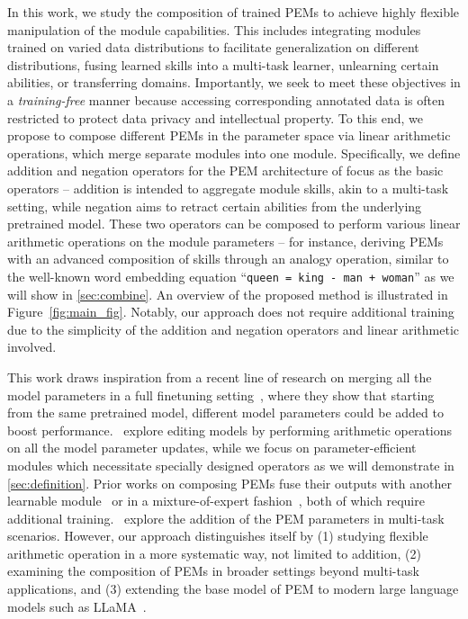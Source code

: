 In this work, we study the composition of trained PEMs to achieve highly flexible manipulation of the module capabilities. This includes integrating modules trained on varied data distributions to facilitate generalization on different distributions, fusing learned skills into a multi-task learner, unlearning certain abilities, or 
transferring domains.
Importantly, we seek to meet these objectives in a \emph{training-free} manner because accessing corresponding annotated data is often restricted to protect data privacy and intellectual property.
To this end, we propose to compose different PEMs in the parameter space via linear arithmetic operations, which merge separate modules into one module. 
Specifically, we define addition and negation operators for the PEM architecture of focus as the basic operators -- addition is intended to aggregate module skills, akin to a multi-task setting, while negation aims to retract certain abilities from the underlying pretrained model. 
These two operators can be composed to perform various linear arithmetic operations on the module parameters -- for instance, deriving PEMs with an advanced composition of skills through an analogy operation, similar to the well-known word embedding equation ``\texttt{queen = king - man + woman}'' as we will show in \textsection\ref{sec:combine}.
An overview of the proposed method is illustrated in Figure~\ref{fig:main_fig}.
Notably, our approach does not require additional training due to the simplicity of the addition and negation operators and linear arithmetic involved. 

This work draws inspiration from a recent line of research on merging all the model parameters in a full finetuning setting~\citep{wortsman2022model,matena2022merging,jin2022dataless}, where they show that starting from the same pretrained model, different model parameters could be added to boost performance.~\citet{ilharco2022editing} explore editing models by performing arithmetic operations on all the model parameter updates, while we focus on parameter-efficient modules which necessitate specially designed operators as we will demonstrate in \textsection\ref{sec:definition}. 
Prior works on composing PEMs fuse their outputs with another learnable module~\citep{pfeiffer2021adapterfusion} or in a mixture-of-expert fashion~\citep{wang2022adamix}, both of which require additional training.~\citet{qin2022exploring,chronopoulou2023adaptersoup} explore the addition of the PEM parameters in multi-task scenarios. 
However, our approach distinguishes itself by (1) studying flexible arithmetic operation in a more systematic way, not limited to addition, (2) examining the composition of PEMs in broader settings beyond multi-task applications, and (3) extending the base model of PEM to modern large language models such as LLaMA~\citep{touvron2023llama}.


